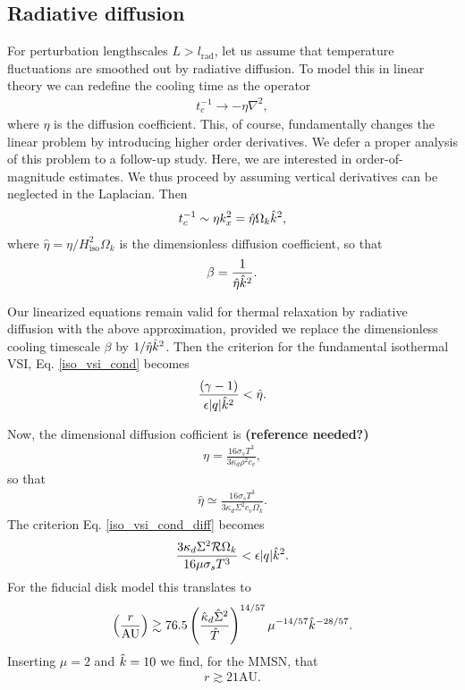 \subsection{Radiative diffusion}
For perturbation lengthscales $L>l_\mathrm{rad}$,  
let us assume that temperature fluctuations are smoothed out by
radiative diffusion. To model this in linear theory we can redefine
the cooling time as the operator 
\begin{align}
  t_c^{-1} \to -\eta \nabla^2, 
\end{align}
where $\eta$ is the diffusion coefficient. This, of course,
fundamentally changes the linear problem by introducing higher order
derivatives. We defer a proper analysis of this problem to a follow-up
study. Here, we are interested in order-of-magnitude estimates. We
thus proceed by assuming vertical derivatives can be neglected in the
Laplacian. Then
\begin{align}
  t_c^{-1} \sim \eta k_x^2 = \hat{\eta} \Omega_k \hat{k}^2,
\end{align}
where $\hat{\eta} = \eta/H_\mathrm{iso}^2\Omega_k$ is the
dimensionless diffusion coefficient, so that
\begin{align}
  \beta = \frac{1}{\hat{\eta}\hat{k}^2}. 
\end{align}

Our linearized equations remain valid for thermal relaxation by
radiative diffusion with the above approximation, provided we replace
the dimensionless cooling timescale $\beta$ by
$1/\hat{\eta}\hat{k}^2$. Then the criterion for the fundamental
isothermal VSI, Eq. \ref{iso_vsi_cond} becomes
\begin{align}\label{iso_vsi_cond_diff}
  \frac{(\gamma-1)}{\epsilon |q|\hat{k}^2}< \hat{\eta}. 
\end{align}

Now, the dimensional diffusion cofficient is {\bf(reference needed?)}
\begin{align}
  \eta = \frac{16\sigma_s T^3}{3\kappa_d\rho^2 c_v}, 
\end{align}
so that
\begin{align}\label{diff_coeff_dimensionless}
  \hat{\eta} \simeq  \frac{16\sigma_s T^3}{3\kappa_d\Sigma^2
    c_v\Omega_k}. 
\end{align}
The criterion Eq. \ref{iso_vsi_cond_diff} becomes
\begin{align}
\frac{3\kappa_d\Sigma^2\mathcal{R}
  \Omega_k}{16\mu\sigma_s T^3} < \epsilon |q| \hat{k}^2. 
\end{align}
For the fiducial disk model this translates to
\begin{align}
  \left(\frac{r}{\mathrm{AU}}\right) \gtrsim
  76.5\left(\frac{\hat{\kappa}_d\hat{\Sigma}^2}{\hat{T}}\right)^{14/57}\mu^{-14/57}\hat{k}^{-28/57}. 
\end{align} 
Inserting $\mu=2$ and $\hat{k}=10$ we find, for the MMSN, that
\begin{align*}
  r\gtrsim 21 \mathrm{AU}. 
\end{align*}

